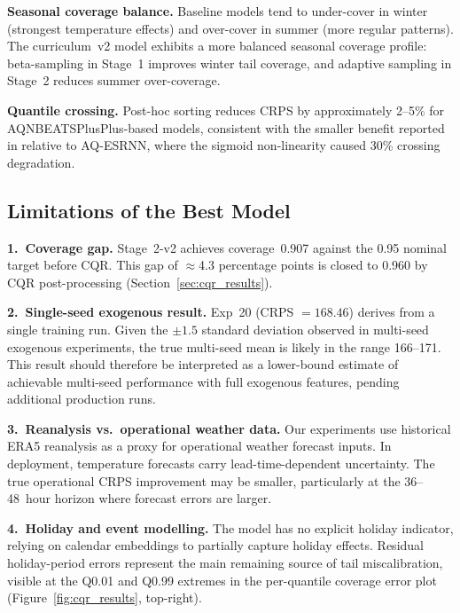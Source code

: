 \textbf{Seasonal coverage balance.}
Baseline models tend to under-cover in winter (strongest temperature
effects) and over-cover in summer (more regular patterns).
The curriculum~v2 model exhibits a more balanced seasonal coverage profile:
beta-sampling in Stage~1 improves winter tail coverage, and adaptive
sampling in Stage~2 reduces summer over-coverage.

\textbf{Quantile crossing.}
Post-hoc sorting reduces CRPS by approximately 2--5\% for AQNBEATSPlusPlus-based
models, consistent with the smaller benefit reported in
\cite{smyl2025anyquantile} relative to AQ-ESRNN, where the sigmoid
non-linearity caused 30\% crossing degradation.

\subsection{Limitations of the Best Model}
\label{subsec:limitations}

\textbf{1.~Coverage gap.}
Stage~2-v2 achieves coverage~0.907 against the 0.95 nominal target
before CQR.  This gap of $\approx$4.3 percentage points is closed to
0.960 by CQR post-processing (Section~\ref{sec:cqr_results}).

\textbf{2.~Single-seed exogenous result.}
Exp~20 (CRPS $= 168.46$) derives from a single training run.
Given the $\pm1.5$ standard deviation observed in multi-seed exogenous
experiments, the true multi-seed mean is likely in the range 166--171.
This result should therefore be interpreted as a lower-bound estimate
of achievable multi-seed performance with full exogenous features,
pending additional production runs.

\textbf{3.~Reanalysis vs.\ operational weather data.}
Our experiments use historical ERA5 reanalysis as a proxy for operational
weather forecast inputs.  In deployment, temperature forecasts carry
lead-time-dependent uncertainty.  The true operational CRPS improvement
may be smaller, particularly at the 36--48~hour horizon where
forecast errors are larger.

\textbf{4.~Holiday and event modelling.}
The model has no explicit holiday indicator, relying on calendar embeddings
to partially capture holiday effects.  Residual holiday-period errors
represent the main remaining source of tail miscalibration, visible at
the Q0.01 and Q0.99 extremes in the per-quantile coverage error plot
(Figure~\ref{fig:cqr_results}, top-right).

